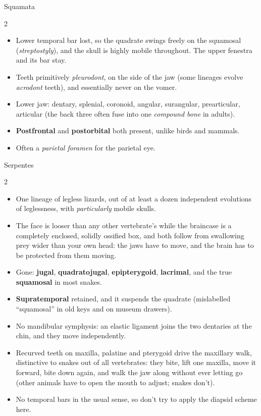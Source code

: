 \documentclass[11pt]{article}
\newcommand{\bone}[1]{\textbf{#1}}
\newcommand{\term}[1]{\textsl{#1}}
\begin{document}
\begin{cladebox}{Squamata}
\begin{multicols}{2}
\begin{itemize}
\item Lower temporal bar lost, so the quadrate swings freely on the squamosal
  (\term{streptostyly}), and the skull is highly mobile throughout. The upper
  fenestra and its bar stay.
\item Teeth primitively \term{pleurodont}, on the side of the jaw (some lineages
  evolve \term{acrodont} teeth), and essentially never on the vomer.
\item Lower jaw: dentary, splenial, coronoid, angular, surangular, prearticular,
  articular (the back three often fuse into one \term{compound bone} in
  adults).
\item \bone{Postfrontal} and \bone{postorbital} both present, unlike birds and
  mammals.
\item Often a \term{parietal foramen} for the parietal eye.
\end{itemize}
\end{multicols}
\end{cladebox}

\begin{cladebox}{Serpentes}
\begin{multicols}{2}
\begin{itemize}
\item One lineage of legless lizards, out of at least a dozen independent
  evolutions of leglessness, with \emph{particularly} mobile skulls.
\item The face is looser than any other vertebrate's while the braincase is a
  completely enclosed, solidly ossified box, and both follow from swallowing prey
  wider than your own head: the jaws have to move, and the brain has to be
  protected from them moving.
\item Gone: \bone{jugal}, \bone{quadratojugal}, \bone{epipterygoid},
  \bone{lacrimal}, and the true \bone{squamosal} in most snakes.
\item \bone{Supratemporal} retained, and it suspends the quadrate (mislabelled
  ``squamosal'' in old keys and on museum drawers).
\item No mandibular symphysis: an elastic ligament joins the two dentaries at the
  chin, and they move independently.
\item Recurved teeth on maxilla, palatine and pterygoid drive the maxillary walk,
  distinctive to snakes out of all vertebrates: they bite, lift one maxilla,
  move it forward, bite down again, and walk the jaw along without ever letting go (other animals have to open the
  mouth to adjust; snakes don't).
\item No temporal bars in the usual sense, so don't try to apply the diapsid scheme
  here.
\end{itemize}
\end{multicols}
\end{cladebox}
\end{document}
